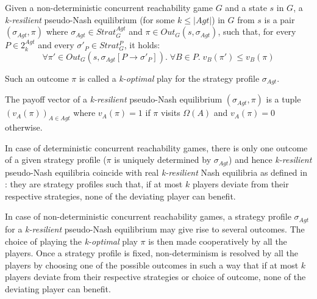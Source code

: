 \begin{definition}
Given a non-deterministic concurrent reachability game $G$ and a state $s$ in $G$, a \textit{k-resilient} pseudo-Nash equilibrium (for some $k \leq \vert Agt \vert$) in $G$ from $s$ is a pair $(\sigma_{Agt}, \pi)$ where $\sigma_{Agt} \in Strat^{Agt}_{G}$ and $\pi \in Out_{G}(s, \sigma_{Agt})$, such that, for every $P \in 2^{Agt}_{k}$ and every $\sigma'_{P} \in Strat^{P}_{G}$, it holds:
\[\forall \pi' \in Out_{G}(s, \sigma_{Agt}[P \rightarrow \sigma'_{P}]). \; \forall B \in P. \; v_{B}(\pi') \leq v_{B}(\pi)\]

Such an outcome $\pi$ is called a \textit{k-optimal} play for the strategy profile $\sigma_{Agt}$.
\end{definition}

The payoff vector of a \textit{k-resilient} pseudo-Nash equilibrium $(\sigma_{Agt}, \pi)$ is a tuple $(v_{A}(\pi))_{A \in Agt}$ where $v_{A}(\pi) = 1$ if $\pi$ visits $\Omega (A)$ and $v_{A}(\pi) = 0$ otherwise.

In case of deterministic concurrent reachability games, there is only one outcome of a given strategy profile ($\pi$ is uniquely determined by $\sigma_{Agt}$) and hence \textit{k-resilient} pseudo-Nash equilibria coincide with real \textit{k-resilient} Nash equilibria as defined in \cite{Abraham-2006,Abraham-2008}: they are strategy profiles such that, if at most $k$ players deviate from their respective strategies, none of the deviating player can benefit.

In case of non-deterministic concurrent reachability games, a strategy profile $\sigma_{Agt}$ for a \textit{k-resilient} pseudo-Nash equilibrium may give rise to several outcomes. The choice of playing the \textit{k-optimal} play $\pi$ is then made cooperatively by all the players. Once a strategy profile is fixed, non-determinism is resolved by all the players by choosing one of the possible outcomes in such a way that if at most $k$ players deviate from their respective strategies or choice of outcome, none of the deviating player can benefit.

